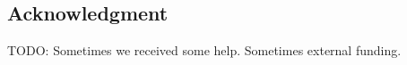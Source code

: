 \documentclass[a4paper, conference]{IEEEtran}
\newcommand{\todo}[1]{{\color{olive} TODO: #1}}
\begin{document}
\subsection*{Acknowledgment}

\todo{Sometimes we received some help. Sometimes external funding.}






\end{document}
